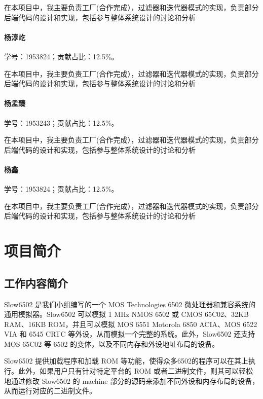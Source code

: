 \documentclass[cn,black,12pt,normal]{elegantnote}
\begin{document}
在本项目中，我主要负责工厂(合作完成），过滤器和迭代器模式的实现，负责部分后端代码的设计和实现，包括参与整体系统设计的讨论和分析

\paragraph*{杨淳屹} 学号：1953824；贡献占比：12.5\%。

在本项目中，我主要负责工厂(合作完成），过滤器和迭代器模式的实现，负责部分后端代码的设计和实现，包括参与整体系统设计的讨论和分析

\paragraph*{杨孟臻} 学号：1953243；贡献占比：12.5\%。

在本项目中，我主要负责工厂(合作完成），过滤器和迭代器模式的实现，负责部分后端代码的设计和实现，包括参与整体系统设计的讨论和分析

\paragraph*{杨鑫} 学号：1953824；贡献占比：12.5\%。

在本项目中，我主要负责工厂(合作完成），过滤器和迭代器模式的实现，负责部分后端代码的设计和实现，包括参与整体系统设计的讨论和分析


\newpage

\tableofcontents

\newpage

\section{项目简介}

\subsection{工作内容简介}

Slow6502 是我们小组编写的一个 MOS Technologies 6502 微处理器和兼容系统的通用模拟器。Slow6502 可以模拟 1 MHz NMOS 6502 或 CMOS 65C02、32KB RAM、16KB ROM，并且可以模拟 MOS 6551 Motorola 6850 ACIA、MOS 6522 VIA 和 6545 CRTC 等外设，从而模拟一个完整的系统。此外，Slow6502 还支持 MOS 65C02 等 6502 的变体，以及不同内存和外设地址布局的设备。

Slow6502 提供加载程序和加载 ROM 等功能，使得众多6502的程序可以在其上执行。此外，如果用户只有针对特定平台的 ROM 或者二进制文件，则其可以轻松地通过修改 Slow6502 的 machine 部分的源码来添加不同外设和内存布局的设备，从而运行对应的二进制文件。
\end{document}
